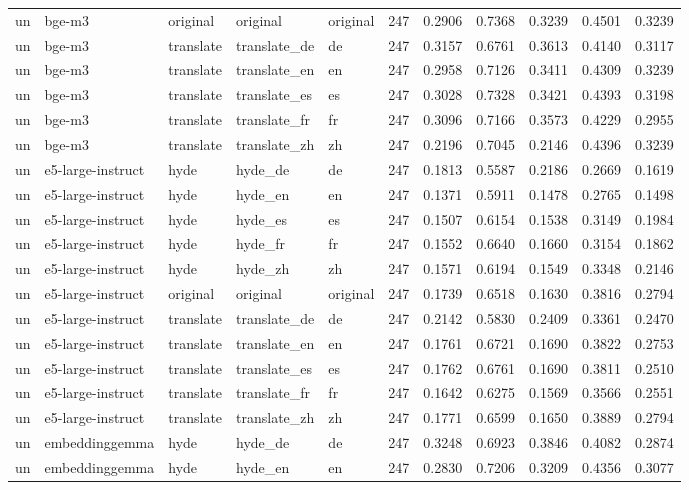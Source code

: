 \begin{tabular}{lllllrrrrrr}
un & bge-m3 & original & original & original & 247 & 0.2906 & 0.7368 & 0.3239 & 0.4501 & 0.3239 \\
un & bge-m3 & translate & translate\_de & de & 247 & 0.3157 & 0.6761 & 0.3613 & 0.4140 & 0.3117 \\
un & bge-m3 & translate & translate\_en & en & 247 & 0.2958 & 0.7126 & 0.3411 & 0.4309 & 0.3239 \\
un & bge-m3 & translate & translate\_es & es & 247 & 0.3028 & 0.7328 & 0.3421 & 0.4393 & 0.3198 \\
un & bge-m3 & translate & translate\_fr & fr & 247 & 0.3096 & 0.7166 & 0.3573 & 0.4229 & 0.2955 \\
un & bge-m3 & translate & translate\_zh & zh & 247 & 0.2196 & 0.7045 & 0.2146 & 0.4396 & 0.3239 \\
un & e5-large-instruct & hyde & hyde\_de & de & 247 & 0.1813 & 0.5587 & 0.2186 & 0.2669 & 0.1619 \\
un & e5-large-instruct & hyde & hyde\_en & en & 247 & 0.1371 & 0.5911 & 0.1478 & 0.2765 & 0.1498 \\
un & e5-large-instruct & hyde & hyde\_es & es & 247 & 0.1507 & 0.6154 & 0.1538 & 0.3149 & 0.1984 \\
un & e5-large-instruct & hyde & hyde\_fr & fr & 247 & 0.1552 & 0.6640 & 0.1660 & 0.3154 & 0.1862 \\
un & e5-large-instruct & hyde & hyde\_zh & zh & 247 & 0.1571 & 0.6194 & 0.1549 & 0.3348 & 0.2146 \\
un & e5-large-instruct & original & original & original & 247 & 0.1739 & 0.6518 & 0.1630 & 0.3816 & 0.2794 \\
un & e5-large-instruct & translate & translate\_de & de & 247 & 0.2142 & 0.5830 & 0.2409 & 0.3361 & 0.2470 \\
un & e5-large-instruct & translate & translate\_en & en & 247 & 0.1761 & 0.6721 & 0.1690 & 0.3822 & 0.2753 \\
un & e5-large-instruct & translate & translate\_es & es & 247 & 0.1762 & 0.6761 & 0.1690 & 0.3811 & 0.2510 \\
un & e5-large-instruct & translate & translate\_fr & fr & 247 & 0.1642 & 0.6275 & 0.1569 & 0.3566 & 0.2551 \\
un & e5-large-instruct & translate & translate\_zh & zh & 247 & 0.1771 & 0.6599 & 0.1650 & 0.3889 & 0.2794 \\
un & embeddinggemma & hyde & hyde\_de & de & 247 & 0.3248 & 0.6923 & 0.3846 & 0.4082 & 0.2874 \\
un & embeddinggemma & hyde & hyde\_en & en & 247 & 0.2830 & 0.7206 & 0.3209 & 0.4356 & 0.3077 \\

\end{tabular}
